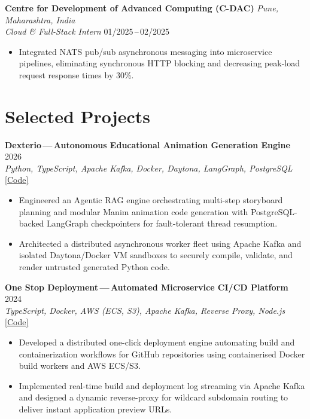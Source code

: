 \documentclass[10pt,a4paper]{article}
\begin{document}
\vspace{0.22em}

\textbf{Centre for Development of Advanced Computing (C-DAC)} \hfill \textit{Pune, Maharashtra, India}\\
\textit{Cloud \& Full-Stack Intern} \hfill 01/2025\,--\,02/2025
\begin{itemize}
  \item Integrated NATS pub/sub asynchronous messaging into microservice pipelines, eliminating synchronous HTTP blocking and decreasing peak-load request response times by 30\%.
\end{itemize}

\vspace{-0.15em}

\section{Selected Projects}

\textbf{Dexterio\,---\,Autonomous Educational Animation Generation Engine} \hfill 2026\\
\textit{Python, TypeScript, Apache Kafka, Docker, Daytona, LangGraph, PostgreSQL} \hfill \href{https://github.com/jayraj-kl/dexterio}{[\;Code]}
\begin{itemize}
  \item Engineered an Agentic RAG engine orchestrating multi-step storyboard planning and modular Manim animation code generation with PostgreSQL-backed LangGraph checkpointers for fault-tolerant thread resumption.
  \item Architected a distributed asynchronous worker fleet using Apache Kafka and isolated Daytona/Docker VM sandboxes to securely compile, validate, and render untrusted generated Python code.
\end{itemize}

\vspace{0.22em}

\textbf{One Stop Deployment\,---\,Automated Microservice CI/CD Platform} \hfill 2024\\
\textit{TypeScript, Docker, AWS (ECS, S3), Apache Kafka, Reverse Proxy, Node.js} \hfill \href{https://github.com/jayraj-kl}{[\;Code]}
\begin{itemize}
  \item Developed a distributed one-click deployment engine automating build and containerization workflows for GitHub repositories using containerised Docker build workers and AWS ECS/S3.
  \item Implemented real-time build and deployment log streaming via Apache Kafka and designed a dynamic reverse-proxy for wildcard subdomain routing to deliver instant application preview URLs.
\end{itemize}
\end{document}
